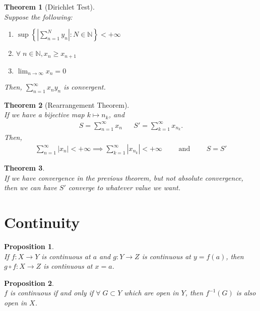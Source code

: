 \documentclass[10pt,a4paper]{article}
\newtheorem{theorem}{Theorem}
\newtheorem{proposition}{Proposition}
\theoremstyle{definition}
\theoremstyle{definition}
\numberwithin{equation}{section}
\numberwithin{theorem}{section}
\numberwithin{proposition}{section}
\numberwithin{lemma}{section}
\numberwithin{corollary}{section}
\begin{document}
\begin{theorem}[Dirichlet Test]$ $
\\Suppose the following:
\begin{enumerate}
\item $\displaystyle \sup\left\{\left| \sum_{n = 1}^N y_n \right| : N \in \mathbb{N}\right\} < +\infty$
\item $\forall \; n \in \mathbb{N}, x_n \geq x_{n + 1}$
\item $\displaystyle \lim_{n \to \infty} x_n = 0$
\end{enumerate}
Then, $\displaystyle \sum_{n = 1}^\infty x_n y_n$ is convergent.
\end{theorem}

\begin{theorem}[Rearrangement Theorem]$ $
\\If we have a bijective map $k \mapsto n_k$, and 
\begin{align*}
S = \sum_{n = 1}^\infty x_n && S' = \sum_{k = 1}^\infty x_{n_k}.
\end{align*}
Then, 
\begin{align*}
\sum_{n = 1}^\infty |x_n| < +\infty \implies \sum_{k = 1}^\infty |x_{n_k}| < +\infty \qquad \text{ and } \qquad S = S'
\end{align*}
\end{theorem}

\begin{theorem}$ $
\\If we have convergence in the previous theorem, but not absolute convergence, then we can have $S'$ converge to whatever value we want.
\end{theorem}

\newpage
\section{Continuity}
\begin{proposition}$ $
\\If $f: X \to Y$ is continuous at $a$ and $g: Y \to Z$ is continuous at $y = f(a)$, then $g \circ f: X \to Z$ is continuous at $x = a$. 
\end{proposition}

\begin{proposition}$ $
\\$f$ is continuous if and only if $\forall \; G \subset Y$ which are open in $Y$, then $f^{-1}(G)$ is also open in $X$. 
\end{proposition}
\end{document}
